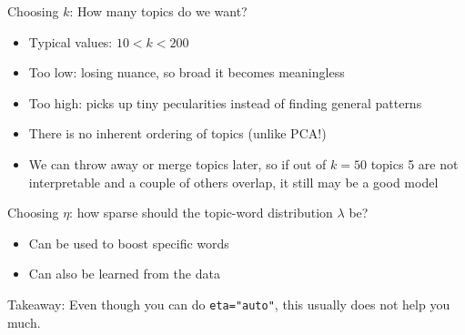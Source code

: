 \documentclass[handout]{beamer}
\begin{document}
\begin{frame}{Choosing $k$: How many topics do we want?}
	\begin{itemize}
		\item Typical values: $10<k<200$
		\item Too low: losing nuance, so broad it becomes meaningless
		\item Too high: picks up tiny pecularities instead of finding general patterns
		\item There is no inherent ordering of topics (unlike PCA!)
		\item We can throw away or merge topics later, so if out of $k=50$ topics 5 are not interpretable and a couple of others overlap, it still may be a good model
	\end{itemize}
\end{frame}




\begin{frame}{Choosing $\eta$: how sparse should the topic-word distribution $\lambda$ be?}
	\begin{itemize}
		\item Can be used to boost specific words
		\item Can also be learned from the data 
	\end{itemize}
	
	\pause
Takeaway: Even though you can do \texttt{eta="auto"}, this usually does not help you much.
	
\end{frame}
\end{document}
